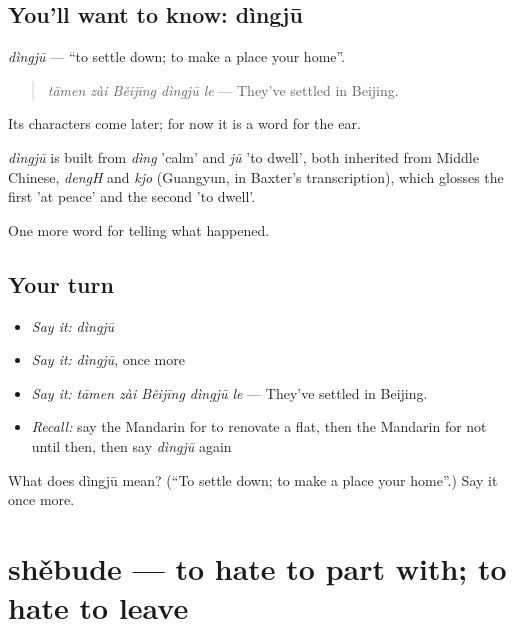 \subsection*{You'll want to know: dìngjū}
\emph{dìngjū} — \textquotedblleft{}to settle down; to make a place your home\textquotedblright{}.

\begin{quote}
\emph{tāmen zài Běijīng dìngjū le} — They've settled in Beijing.
\end{quote}

Its characters come later; for now it is a word for the ear.

\begin{cousinweb}
\emph{dìngjū} is built from \emph{dìng} 'calm' and \emph{jū} 'to dwell', both inherited from Middle Chinese, \emph{dengH} and \emph{kjo} (Guangyun, in Baxter's transcription), which glosses the first 'at peace' and the second 'to dwell'.
\end{cousinweb}

\begin{grammarlens}[title={What you've built}]
One more word for telling what happened.
\end{grammarlens}

\subsection*{Your turn}
\begin{itemize}
\raggedright
  \item \emph{Say it:} \emph{dìngjū}
  \item \emph{Say it:} \emph{dìngjū}, once more
  \item \emph{Say it:} \emph{tāmen zài Běijīng dìngjū le} — They've settled in Beijing.
  \item \emph{Recall:} say the Mandarin for to renovate a flat, then the Mandarin for not until then, then say \emph{dìngjū} again
\end{itemize}

\begin{tcolorbox}[breakable,colback=teal!4,colframe=teal!35!black,title={Before you move on}]
What does dìngjū mean? (\textquotedblleft{}To settle down; to make a place your home\textquotedblright{}.) Say it once more.
\end{tcolorbox}
\section[shěbude]{shěbude — to hate to part with; to hate to leave}

